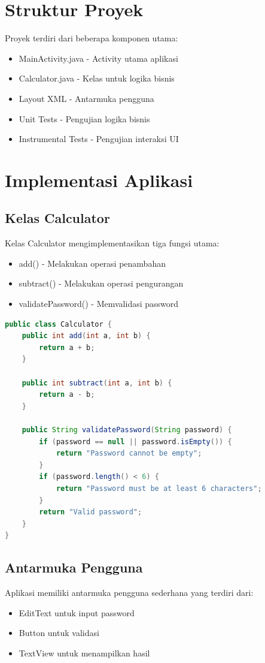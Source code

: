 \documentclass[12pt,a4paper]{article}
\begin{document}
\section{Struktur Proyek}
Proyek terdiri dari beberapa komponen utama:
\begin{itemize}
    \item MainActivity.java - Activity utama aplikasi
    \item Calculator.java - Kelas untuk logika bisnis
    \item Layout XML - Antarmuka pengguna
    \item Unit Tests - Pengujian logika bisnis
    \item Instrumental Tests - Pengujian interaksi UI
\end{itemize}

\section{Implementasi Aplikasi}

\subsection{Kelas Calculator}
Kelas Calculator mengimplementasikan tiga fungsi utama:
\begin{itemize}
    \item add() - Melakukan operasi penambahan
    \item subtract() - Melakukan operasi pengurangan
    \item validatePassword() - Memvalidasi password
\end{itemize}

\begin{lstlisting}[language=Java, caption=Calculator.java]
public class Calculator {
    public int add(int a, int b) {
        return a + b;
    }
    
    public int subtract(int a, int b) {
        return a - b;
    }
    
    public String validatePassword(String password) {
        if (password == null || password.isEmpty()) {
            return "Password cannot be empty";
        }
        if (password.length() < 6) {
            return "Password must be at least 6 characters";
        }
        return "Valid password";
    }
}
\end{lstlisting}

\subsection{Antarmuka Pengguna}
Aplikasi memiliki antarmuka pengguna sederhana yang terdiri dari:
\begin{itemize}
    \item EditText untuk input password
    \item Button untuk validasi
    \item TextView untuk menampilkan hasil
\end{itemize}
\end{document}
